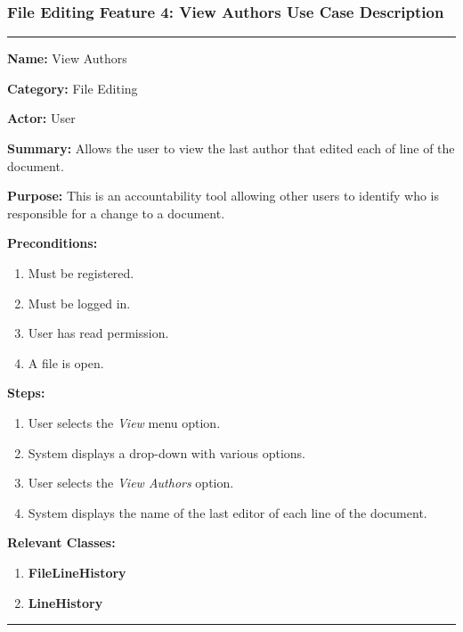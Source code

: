 \documentclass[twoside,letterpaper]{article}
\begin{document}
\newpage

\subsubsection[File Editing Feature 4: View Authors]{\rmfamily\bfseries\color{black}
	File Editing Feature 4: View Authors Use Case Description}
\hypertarget{RefHeading22059017292}{}

\vspace{2pt}
\hrule
\vspace{8pt}
	\noindent\textbf{Name:} View Authors \newline
	
	\noindent\textbf{Category:} File Editing \newline
	
	\noindent\textbf{Actor:} User \newline
	
	\noindent\textbf{Summary:} Allows the user to view the last author that edited each of line of the document. \newline
	
	\noindent\textbf{Purpose:} This is an accountability tool allowing other users to identify who is responsible for a change to a document. \newline
	
	\noindent\textbf{Preconditions:}
	\begin{enumerate}
		\item Must be registered.
		\item Must be logged in.
		\item User has read permission.
		\item A file is open.
	\end{enumerate}
	\noindent\textbf{Steps:}
	\begin{enumerate}
		\item User selects the \textit{View} menu option.
		\item System displays a drop-down with various options.
		\item User selects the \textit{View Authors} option.
		\item System displays the name of the last editor of each line of the document.
	\end{enumerate}
	\noindent\textbf{Relevant Classes:}
	\begin{enumerate}
		\item \textbf {FileLineHistory}
		\item \textbf {LineHistory}
	\end{enumerate}
\vspace{8pt}
\hrule
\newpage
\end{document}
